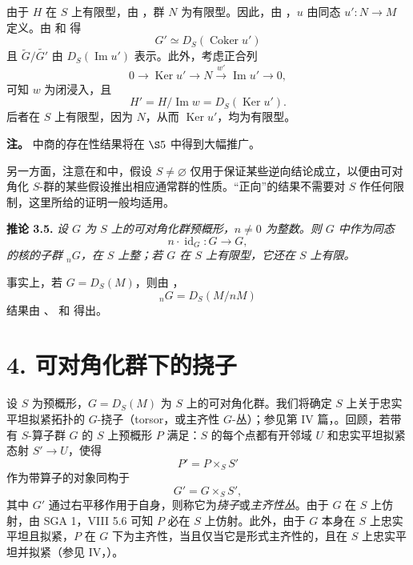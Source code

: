 由于 \(H\) 在 \(S\) 上有限型，由 ，群 \(N\) 为有限型。因此，由 ，\(u\) 由同态 \(u':N\to M\) 定义。由  和  得
\[
  G'\simeq D_S(\operatorname{Coker}u')
\]
且 \(\widetilde G/\widetilde{G'}\) 由 \(D_S(\operatorname{Im}u')\) 表示。此外，考虑正合列
\[
  0\longrightarrow\operatorname{Ker}u'
   \longrightarrow N
   \xrightarrow{w'}\operatorname{Im}u'
   \longrightarrow0,
\]
可知 \(w\) 为闭浸入，且
\[
  H'=H/\operatorname{Im}w=D_S(\operatorname{Ker}u').
\]
后者在 \(S\) 上有限型，因为 \(N\)，从而 \(\operatorname{Ker}u'\)，均为有限型。

\medskip
\noindent{}\textbf{注。}
 中商的存在性结果将在 \(\SGARefLink{sga3:viii:section:5}{\S5}\) 中得到大幅推广。

另一方面，注意在和中，假设 \(S\ne\varnothing\) 仅用于保证某些逆向结论成立，以便由可对角化 \(S\)-群的某些假设推出相应通常群的性质。“正向”的结果不需要对 \(S\) 作任何限制，这里所给的证明一般均适用。

\medskip
\noindent{}\textbf{推论 3.5.}
\textit{设 \(G\) 为 \(S\) 上的可对角化群预概形，\(n\ne0\) 为整数。则 \(G\) 中作为同态}
\[
  n\mathbin{\cdot}\operatorname{id}_G:G\longrightarrow G,
\]
\textit{的核的子群 \({}_nG\)，在 \(S\) 上整；若 \(G\) 在 \(S\) 上有限型，它还在 \(S\) 上有限。}

事实上，若 \(G=D_S(M)\)，则由 ，
\[
  {}_nG=D_S(M/nM)
\]
结果由 、 和  得出。

\section*{4. 可对角化群下的挠子}

设 \(S\) 为预概形，\(G=D_S(M)\) 为 \(S\) 上的可对角化群。我们将确定 \(S\) 上关于忠实平坦拟紧拓扑的 \(G\)-挠子（torsor，或主齐性 \(G\)-丛）；参见第 IV 篇，。回顾，若带有 \(S\)-算子群 \(G\) 的 \(S\) 上预概形 \(P\) 满足：\(S\) 的每个点都有开邻域 \(U\) 和忠实平坦拟紧态射 \(S'\to U\)，使得
\[
  P'=P\times_SS'
\]
作为带算子的对象同构于
\[
  G'=G\times_SS',
\]
其中 \(G'\) 通过右平移作用于自身，则称它为\emph{挠子}或\emph{主齐性丛}。由于 \(G\) 在 \(S\) 上仿射，由 SGA 1，VIII 5.6 可知 \(P\) 必在 \(S\) 上仿射。此外，由于 \(G\) 本身在 \(S\) 上忠实平坦且拟紧，\(P\) 在 \(G\) 下为主齐性，当且仅当它是形式主齐性的，且在 \(S\) 上忠实平坦并拟紧（参见 IV，）。

